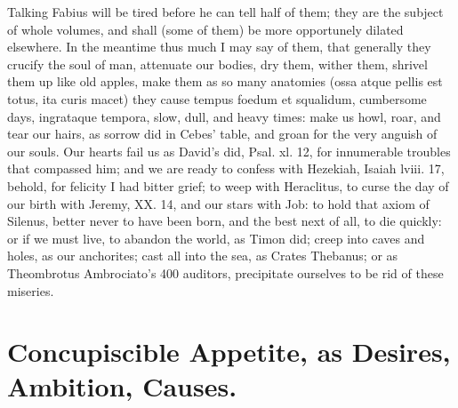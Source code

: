 {Talking Fabius will be tired before he can tell half of them; they are
the subject of whole volumes, and shall (some of them) be more
opportunely dilated elsewhere. In the meantime thus much I may say of
them, that generally they crucify the soul of man, attenuate our
bodies, dry them, wither them, shrivel them up like old apples, make
them as so many anatomies (ossa atque pellis est totus, ita curis
macet) they cause tempus foedum et squalidum, cumbersome days,
ingrataque tempora, slow, dull, and heavy times: make us howl, roar,
and tear our hairs, as sorrow did in Cebes' table, and groan for
the very anguish of our souls. Our hearts fail us as David's did, Psal.
xl. 12, for innumerable troubles that compassed him; and we are ready
to confess with Hezekiah, Isaiah lviii. 17, behold, for felicity I had
bitter grief; to weep with Heraclitus, to curse the day of our birth
with Jeremy, XX. 14, and our stars with Job: to hold that axiom of
Silenus, better never to have been born, and the best next of
all, to die quickly: or if we must live, to abandon the world, as Timon
did; creep into caves and holes, as our anchorites; cast all into the
sea, as Crates Thebanus; or as Theombrotus Ambrociato's 400 auditors,
precipitate ourselves to be rid of these miseries.

\section{Concupiscible Appetite, as Desires, Ambition, Causes.}

}

